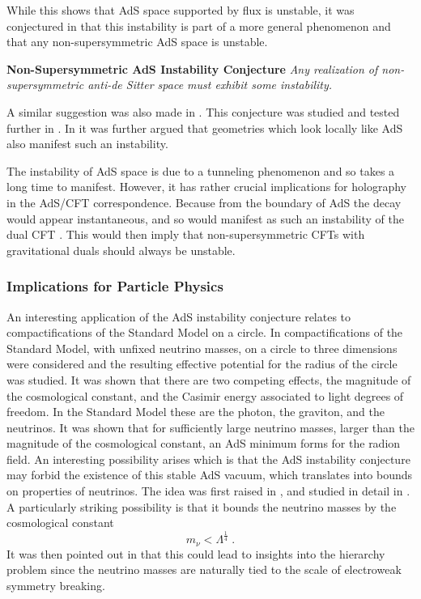 \documentclass[11pt,a4paper]{article}
\numberwithin{equation}{section}
\numberwithin{table}{section}\setlength{\multlinegap}{25pt}
\newcommand{\be}{\begin{equation}}
\newcommand{\ee}{\end{equation}}
\begin{document}
{While this shows that AdS space supported by flux is unstable, it was conjectured in \cite{Ooguri:2016pdq} that this instability is part of a more general phenomenon and that any non-supersymmetric AdS space is unstable. 
\begin{tcolorbox}
{\bf Non-Supersymmetric AdS Instability Conjecture} \;\cite{Ooguri:2016pdq}
{\it 
\newline
\newline
Any realization of non-supersymmetric anti-de Sitter space must exhibit some instability. 
}
\end{tcolorbox}

A similar suggestion was also made in \cite{Freivogel:2016qwc}. This conjecture was studied and tested further in \cite{Danielsson:2016mtx,Banks:2016xpo,Ooguri:2017njy,Danielsson:2017max,Giombi:2017mxl,Aalsma:2018qwy,Antonelli:2018qwz}. In \cite{Buratti:2018onj} it was further argued that geometries which look locally like AdS also manifest such an instability. 

The instability of AdS space is due to a tunneling phenomenon and so takes a long time to manifest. However, it has rather crucial implications for holography in the AdS/CFT correspondence. Because from the boundary of AdS the decay would appear instantaneous, and so would manifest as such an instability of the dual CFT \cite{Horowitz:2007pr}. This would then imply that non-supersymmetric CFTs with gravitational duals should always be unstable.  

\subsubsection{Implications for Particle Physics}

An interesting application of the AdS instability conjecture relates to compactifications of the Standard Model on a circle. In \cite{ArkaniHamed:2007gg} compactifications of the Standard Model, with unfixed neutrino masses, on a circle to three dimensions were considered and the resulting effective potential for the radius of the circle was studied. It was shown that there are two competing effects, the magnitude of the cosmological constant, and the Casimir energy associated to light degrees of freedom. In the Standard Model these are the photon, the graviton, and the neutrinos. It was shown that for sufficiently large neutrino masses, larger than the magnitude of the cosmological constant, an AdS minimum forms for the radion field.  An interesting possibility arises which is that the AdS instability conjecture may forbid the existence of this stable AdS vacuum, which translates into bounds on properties of neutrinos. The idea was first raised in \cite{Ooguri:2016pdq}, and studied in detail in \cite{Ibanez:2017kvh,Ibanez:2017oqr,Hamada:2017yji,Gonzalo:2018tpb,Gonzalo:2018dxi}. A particularly striking possibility is that it bounds the neutrino masses by the cosmological constant
\be
m_{\nu} < \Lambda^{\frac14} \;.
\label{neutrinomassbound}
\ee
It was then pointed out in \cite{Ibanez:2017oqr} that this could lead to insights into the hierarchy problem since the neutrino masses are naturally tied to the scale of electroweak symmetry breaking.

}
\end{document}
